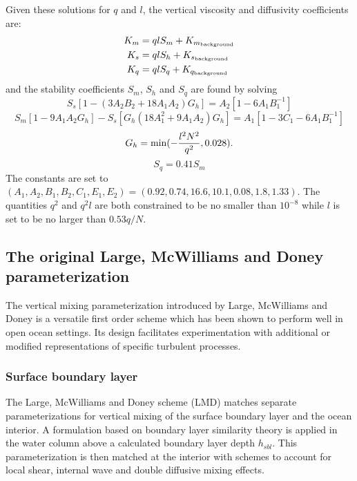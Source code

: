 Given these solutions for $q$ and $l$, the vertical viscosity and
diffusivity coefficients are:
\begin{align}
  K_m &= qlS_m + K_{m_{\rm background}} \\
  K_s &= qlS_h + K_{s_{\rm background}} \\
  K_q &= qlS_q + K_{q_{\rm background}}
\end{align}
and the stability coefficients $S_m$, $S_h$ and $S_q$ are found by
solving
\begin{equation}
  S_s \left[ 1 - (3A_2 B_2 + 18 A_1 A_2) G_h \right] =
  A_2 \left[ 1 - 6A_1 B_1^{-1} \right]
\end{equation}
\begin{equation}
  S_m \left[ 1 - 9A_1 A_2 G_h \right] - S_s \left[ G_h ( 18 A_1^2 +
  9A_1 A_2 ) G_h \right] =
  A_1 \left[ 1 - 3C_1 - 6A_1 B_1^{-1} \right]
\end{equation}
\begin{equation}
  G_h = \min ( -{l^2N^2 \over q^2}, 0.028 ).
\end{equation}
\begin{equation}
  S_q = 0.41 S_m
\end{equation}
The constants are set to $(A_1, A_2, B_1, B_2, C_1, E_1, E_2) = 
(0.92, 0.74, 16.6, 10.1, 0.08, 1.8, 1.33)$. The quantities $q^2$ and
$q^2l$ are both constrained to be no smaller than $10^{-8}$ while $l$
is set to be no larger than $0.53q/N$.
    
\subsection{The original Large, McWilliams and Doney parameterization}
\label{sec:origLMD}

The vertical mixing parameterization introduced by Large, McWilliams
and Doney \cite{Large94} is a versatile first order scheme which has
been shown to perform well in open ocean settings.  Its design
facilitates experimentation with additional or modified representations
of specific turbulent processes.

\subsubsection{Surface boundary layer}
The Large, McWilliams and Doney scheme (LMD)
matches separate parameterizations for vertical mixing
of the surface boundary layer and the ocean interior.  A formulation
based on boundary layer similarity theory is applied in the water
column above a calculated boundary layer depth $h_{sbl}$.  This
parameterization is then matched at the interior with schemes to
account for local shear, internal wave and double diffusive mixing
effects.  


